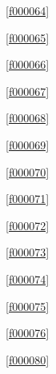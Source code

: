 \noindent\filesourcenumbernameone\ \ref{f000064}\dotfill\pageref{f000064}%

\noindent\filesourcenumbernameone\ \ref{f000065}\dotfill\pageref{f000065}%

\noindent\filesourcenumbernameone\ \ref{f000066}\dotfill\pageref{f000066}%

\noindent\filesourcenumbernameone\ \ref{f000067}\dotfill\pageref{f000067}%

\noindent\filesourcenumbernameone\ \ref{f000068}\dotfill\pageref{f000068}%

\noindent\filesourcenumbernameone\ \ref{f000069}\dotfill\pageref{f000069}%

\noindent\filesourcenumbernameone\ \ref{f000070}\dotfill\pageref{f000070}%

\noindent\filesourcenumbernameone\ \ref{f000071}\dotfill\pageref{f000071}%

\noindent\filesourcenumbernameone\ \ref{f000072}\dotfill\pageref{f000072}%

\noindent\filesourcenumbernameone\ \ref{f000073}\dotfill\pageref{f000073}%

\noindent\filesourcenumbernameone\ \ref{f000074}\dotfill\pageref{f000074}%

\noindent\filesourcenumbernameone\ \ref{f000075}\dotfill\pageref{f000075}%

\noindent\filesourcenumbernameone\ \ref{f000076}\dotfill\pageref{f000076}%

\noindent\filesourcenumbernameone\ \ref{f000080}\dotfill\pageref{f000080}%









